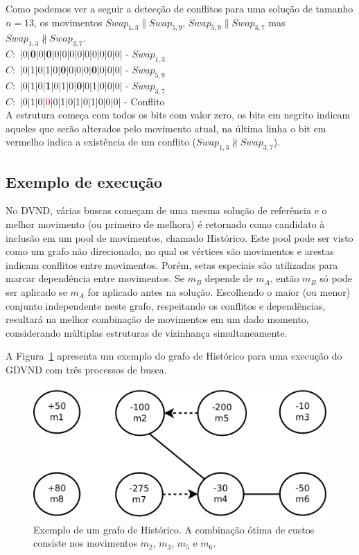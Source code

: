 Como podemos ver a seguir a detecção de conflitos para uma solução de tamanho $n=13$, os movimentos $Swap_{1,3} \parallel Swap_{5,9}$, $Swap_{5,9} \parallel Swap_{3,7}$ mas $Swap_{1,3} \nparallel Swap_{3,7}$.\\
$C:$ |0|\textbf{0}|0|\textbf{0}|0|0|0|0|0|0|0|0|0| - $Swap_{1,3}$ \\
$C:$ |0|1|0|1|0|\textbf{0}|0|0|0|\textbf{0}|0|0|0| - $Swap_{5,9}$ \\
$C:$ |0|1|0|\textbf{1}|0|1|0|\textbf{0}|0|1|0|0|0| - $Swap_{3,7}$ \\
$C:$ |0|1|0|\textcolor{red}{0}|0|1|0|1|0|1|0|0|0| - Conflito \\
A estrutura começa com todos os bits com valor zero, os bits em negrito indicam aqueles que serão alterados pelo movimento atual, na última linha o bit em vermelho indica a existência de um conflito ($Swap_{1,3} \nparallel Swap_{3,7}$).

\subsection{Exemplo de execução} \label{subsec:gdvndExemplo}

No DVND, várias buscas começam de uma mesma solução de referência e o melhor movimento (ou primeiro de melhora) é retornado como candidato à inclusão em um pool de movimentos, chamado Histórico.
Este pool pode ser visto como um grafo não direcionado, no qual os vértices são movimentos e arestas indicam conflitos entre movimentos.
Porém, setas especiais são utilizadas para marcar dependência entre movimentos. Se $m_B$ depende de $m_A$, então $m_B$ só pode ser aplicado se $m_A$ for aplicado antes na solução.
Escolhendo o maior (ou menor) conjunto independente neste grafo, respeitando os conflitos e dependências, resultará na melhor combinação de movimentos em um dado momento, considerando múltiplas estruturas de vizinhança simultaneamente.

A Figura~\ref{fig:exemplo-dvnd} apresenta um exemplo do grafo de Histórico para uma execução do GDVND com três processos de busca.

\begin{figure}[htpb]
    \centering
    \includegraphics[width=0.65\linewidth]{figuras/gdvnd/dvnd_exemp.pdf}
    \caption{Exemplo de um grafo de Histórico.
    A combinação ótima de custos consiste nos movimentos $m_2$, $m_3$, $m_5$ e $m_6$.
    \label{fig:exemplo-dvnd}}
\end{figure}

